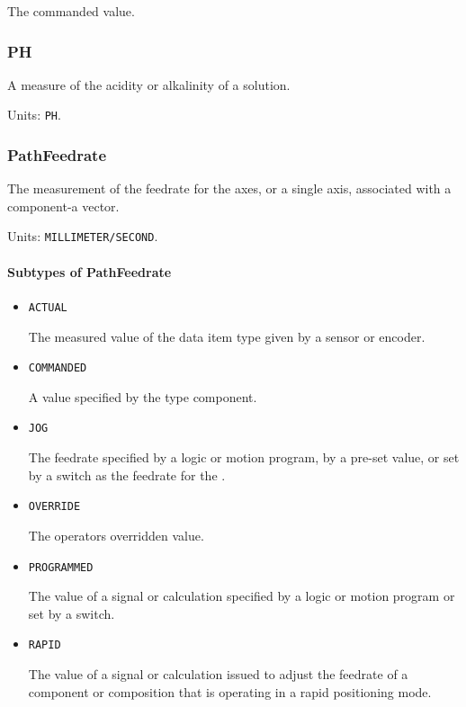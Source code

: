 The commanded value.


\subsubsection{PH}
\label{sec:PH}



A measure of the acidity or alkalinity of a solution.


Units: \texttt{PH}.

\subsubsection{PathFeedrate}
\label{sec:PathFeedrate}



The measurement of the feedrate for the axes, or a single axis, associated with a  component-a vector.


Units: \texttt{MILLIMETER/SECOND}.

\paragraph{Subtypes of PathFeedrate}\mbox{}
\label{sec:Subtypes of PathFeedrate}

\begin{itemize}

\item \texttt{ACTUAL}


The measured value of the data item type given by a sensor or encoder.

\item \texttt{COMMANDED}


A value specified by the  type component.

\item \texttt{JOG}


The feedrate specified by a logic or motion program, by a pre-set value, or set by a switch as the feedrate for the . 

\item \texttt{OVERRIDE}


The operators overridden value.

\item \texttt{PROGRAMMED}


The value of a signal or calculation specified by a logic or motion program or set by a switch.

\item \texttt{RAPID}


The value of a signal or calculation issued to adjust the feedrate of a component or composition that is operating in a rapid positioning mode.


\end{itemize}

